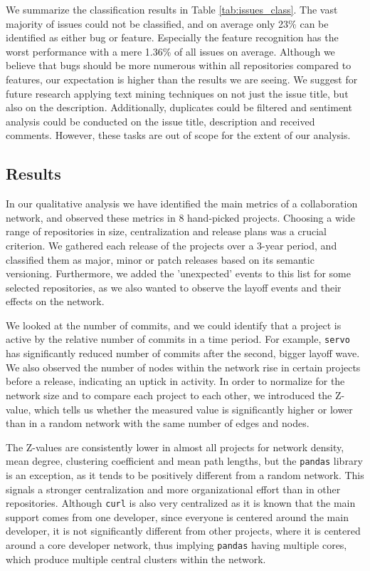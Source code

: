 We summarize the classification results in Table \ref{tab:issues_class}. The vast majority of issues could not be classified, and on average only 23\% can be identified as either bug or feature. Especially the feature recognition has the worst performance with a mere 1.36\% of all issues on average. Although we believe that bugs should be more numerous within all repositories compared to features, our expectation is higher than the results we are seeing. We suggest for future research applying text mining techniques on not just the issue title, but also on the description. Additionally, duplicates could be filtered and sentiment analysis could be conducted on the issue title, description and received comments. However, these tasks are out of scope for the extent of our analysis.

\subsection{Results}

In our qualitative analysis we have identified the main metrics of a collaboration network, and observed these metrics in 8 hand-picked projects. Choosing a wide range of repositories in size, centralization and release plans was a crucial criterion. We gathered each release of the projects over a 3-year period, and classified them as major, minor or patch releases based on its semantic versioning. Furthermore, we added the 'unexpected' events to this list for some selected repositories, as we also wanted to observe the layoff events and their effects on the network.

We looked at the number of commits, and we could identify that a project is active by the relative number of commits in a time period. For example, \texttt{servo} has significantly reduced number of commits after the second, bigger layoff wave. We also observed the number of nodes within the network rise in certain projects before a release, indicating an uptick in activity. In order to normalize for the network size and to compare each project to each other, we introduced the Z-value, which tells us whether the measured value is significantly higher or lower than in a random network with the same number of edges and nodes.

The Z-values are consistently lower in almost all projects for network density, mean degree, clustering coefficient and mean path lengths, but the \texttt{pandas} library is an exception, as it tends to be positively different from a random network. This signals a stronger centralization and more organizational effort than in other repositories. Although \texttt{curl} is also very centralized as it is known that the main support comes from one developer, since everyone is centered around the main developer, it is not significantly different from other projects, where it is centered around a core developer network, thus implying \texttt{pandas} having multiple cores, which produce multiple central clusters within the network.

